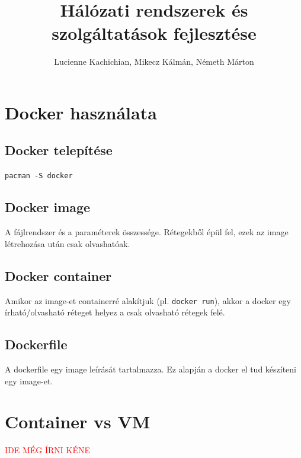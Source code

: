 \documentclass[]{article}
\title{Hálózati rendszerek és szolgáltatások fejlesztése}
\author{Lucienne Kachichian, Mikecz Kálmán, Németh Márton}
\numberwithin{equation}{section}
\begin{document}
\maketitle

\section{Docker használata}

\subsection{Docker telepítése}

\texttt{pacman -S docker}
\subsection{Docker image}

A fájlrendszer és a paraméterek összessége. Rétegekből épül fel, ezek az image létrehozása után csak olvashatóak.

\subsection{Docker container}
Amikor az image-et containerré alakítjuk (pl. \texttt{docker run}), akkor a docker egy írható/olvasható réteget helyez a csak olvasható rétegek felé.

\subsection{Dockerfile}

A dockerfile egy image leírását tartalmazza. Ez alapján a docker el tud készíteni egy image-et.

\section{Container vs VM}

	\textcolor{red}{IDE MÉG ÍRNI KÉNE}
\end{document}
